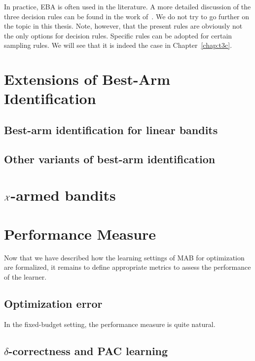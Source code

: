 In practice, EBA is often used in the literature. A more detailed discussion of the three decision rules can be found in the work of~\cite{bubeck2009pure}. We do not try to go further on the topic in this thesis. Note, however, that the present rules are obviously not the only options for decision rules. Specific rules can be adopted for certain sampling rules. We will see that it is indeed the case in Chapter~\ref{chap:t3c}.

\section{Extensions of Best-Arm Identification}\label{sec:mab.extensions}

\subsection{Best-arm identification for linear bandits}\label{sec:mab.extensions.linear}

\subsection{Other variants of best-arm identification}\label{sec:mab.extensions.other}

\section{$\mathcal{X}$-armed bandits}\label{sec:mab.continuum}

\section{Performance Measure}\label{sec:mab.performance}

Now that we have described how the learning settings of MAB for optimization are formalized, it remains to define appropriate metrics to assess the performance of the learner.

\subsection{Optimization error}\label{sec:mab.performance.optim}

In the fixed-budget setting, the performance measure is quite natural.

\subsection{$\delta$-correctness and PAC learning}\label{sec:mab.performance.pac}

